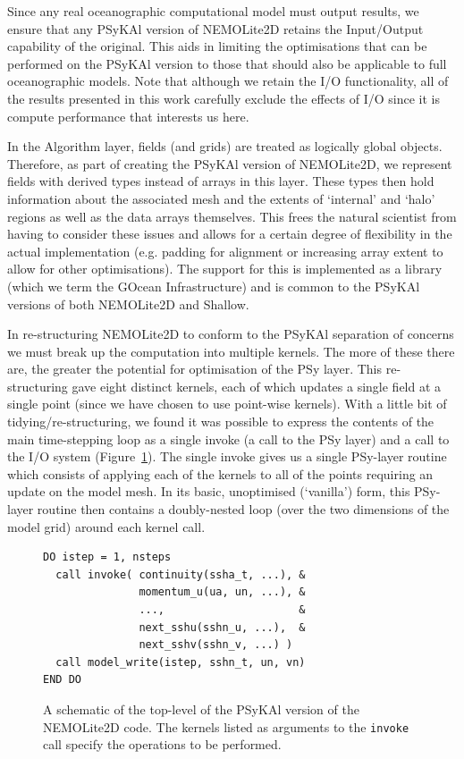 \documentclass[gmdd, manuscript]{copernicus}
\begin{document}
Since any real oceanographic computational model must output results,
we ensure that any {PS}y{KA}l version of NEMOLite2D retains the Input/Output
capability of the original. This aids in limiting the optimisations
that can be performed on the {PS}y{KA}l version to those that should also
be applicable to full oceanographic models. Note that although we
retain the I/O functionality, all of the results presented in this work
carefully exclude the effects of I/O since it is compute performance
that interests us here.

In the Algorithm layer, fields (and grids) are treated as logically
global objects. Therefore, as part of creating the {PS}y{KA}l version
of NEMOLite2D, we represent fields with derived types instead of
arrays in this layer. These types then hold information about the
associated mesh and the extents of `internal' and `halo' regions as
well as the data arrays themselves. This frees the natural scientist
from having to consider these issues and allows for a certain degree
of flexibility in the actual implementation (e.g. padding for
alignment or increasing array extent to allow for other
optimisations). The support for this is implemented as a library
(which we term the GOcean Infrastructure) and is common to the
{PS}y{KA}l versions of both NEMOLite2D and Shallow.

In re-structuring NEMOLite2D to conform to the {PS}y{KA}l separation
of concerns we must break up the computation into multiple
kernels. The more of these there are, the greater the potential for
optimisation of the {PS}y layer. This re-structuring gave eight distinct
kernels, each of which updates a single field at a single point (since
we have chosen to use point-wise kernels). With a little bit of
tidying/re-structuring, we found it was possible to express the
contents of the main time-stepping loop as a single invoke (a call to
the PSy layer) and a call to the I/O system
(Figure~\ref{FIG_psykal_nemolite2d_structure}). The single invoke
gives us a single PSy-layer routine which consists of applying each of
the kernels to all of the points requiring an update on the model
mesh. In its basic, unoptimised (`vanilla') form, this PSy-layer
routine then contains a doubly-nested loop (over the two dimensions of
the model grid) around each kernel call.

\begin{figure}
\centering
\begin{verbatim}
DO istep = 1, nsteps
  call invoke( continuity(ssha_t, ...), &
               momentum_u(ua, un, ...), &
               ...,                     &
               next_sshu(sshn_u, ...),  &
               next_sshv(sshn_v, ...) )
  call model_write(istep, sshn_t, un, vn)
END DO
\end{verbatim}
\caption{A schematic of the top-level of the {PS}y{KA}l version of the
  NEMOLite2D code. The kernels listed as arguments to the \texttt{invoke}
call specify the operations to be performed.}
\label{FIG_psykal_nemolite2d_structure}
\end{figure}
\end{document}
